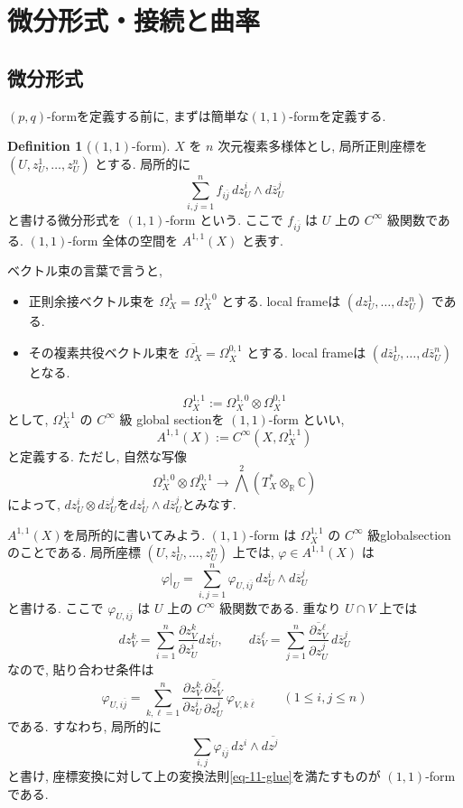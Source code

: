\documentclass[dvipdfmx,a4paper,11pt]{article} %
\theoremstyle{definition}
\newtheorem{defn}[thm]{Definition}
\theoremstyle{remark}
\numberwithin{equation}{section}
\begin{document}
\newpage

\section{微分形式・接続と曲率}
\label{sec-connection}


\subsection{微分形式}
$(p,q)$-formを定義する前に, まずは簡単な$(1,1)$-formを定義する. 
\begin{defn}[\((1,1)\)-form]
\(X\) を \(n\) 次元複素多様体とし, 局所正則座標を \((U,z_U^1,\ldots,z_U^n)\) とする. 局所的に
\[
\sum_{i,j=1}^{n}
f_{i\overline j}\,
dz_U^i\wedge d\overline{z}_U^j
\]
と書ける微分形式を \((1,1)\)-form という. ここで \(f_{i\overline j}\) は \(U\) 上の \(C^\infty\) 級関数である. \((1,1)\)-form 全体の空間を
\(
A^{1,1}(X)
\)
と表す.

ベクトル束の言葉で言うと,
\begin{itemize}
\item 正則余接ベクトル束を
\(
\Omega_X^1=\Omega_X^{1,0}
\)
とする. local frameは
\(
(dz_U^1,\ldots,dz_U^n)
\)
である. 
\item その複素共役ベクトル束を
\(
\overline{\Omega_X^1}=\Omega_X^{0,1}
\)
とする. local frameは
\(
(d\overline{z}_U^1,\ldots,d\overline{z}_U^n)
\)
となる. 
\end{itemize}
\[
\Omega_X^{1,1}
:=
\Omega_X^{1,0}\otimes \Omega_X^{0,1}
\]
として, 
\(\Omega_X^{1,1}\) の \(C^\infty\) 級 global sectionを \((1,1)\)-form といい, 
\[
A^{1,1}(X)
:=
C^\infty(X,\Omega_X^{1,1})
\]
と定義する. 
ただし, 自然な写像
\[
\Omega_X^{1,0}\otimes \Omega_X^{0,1}
\longrightarrow
\bigwedge^2(T_X^*\otimes_{\mathbb R}\mathbb C)
\]
によって,
\(
dz_U^i\otimes d\overline{z}_U^j
\text{を}
dz_U^i\wedge d\overline{z}_U^j
\text{とみなす.}
\)
\end{defn}

$A^{1,1}(X)$を局所的に書いてみよう. 
\((1,1)\)-form は \(\Omega_X^{1,1}\) の \(C^\infty\) 級globalsectionのことである. 
局所座標 \((U,z_U^1,\ldots,z_U^n)\) 上では, \(\varphi\in A^{1,1}(X)\) は
\[
\varphi|_{U}
=
\sum_{i,j=1}^n
\varphi_{U,i\overline{j}}\,
dz_U^i\wedge d\overline{z}_U^j
\]
と書ける. ここで \(\varphi_{U,i\overline{j}}\) は \(U\) 上の \(C^\infty\) 級関数である. 重なり \(U\cap V\) 上では
\[
dz_V^k
=
\sum_{i=1}^n
\frac{\partial z_V^k}{\partial z_U^i}
dz_U^i,
\qquad
d\overline{z}_V^\ell
=
\sum_{j=1}^n
\overline{\frac{\partial z_V^\ell}{\partial z_U^j}}\,
d\overline{z}_U^j
\]
なので, 貼り合わせ条件は
\begin{equation}
\label{eq-11-glue}
\varphi_{U,i\overline{j}}
=
\sum_{k,\ell=1}^n
\frac{\partial z_V^k}{\partial z_U^i}
\overline{\frac{\partial z_V^\ell}{\partial z_U^j}}\,
\varphi_{V,k\overline{\ell}}
\qquad
(1\leq i,j\leq n)
\end{equation}
である. すなわち, 局所的に
\[
\sum_{i,j}\varphi_{i\overline{j}}\,dz^i\wedge d\overline{z^j}
\]
と書け, 座標変換に対して上の変換法則\eqref{eq-11-glue}を満たすものが \((1,1)\)-form である.
\end{document}
